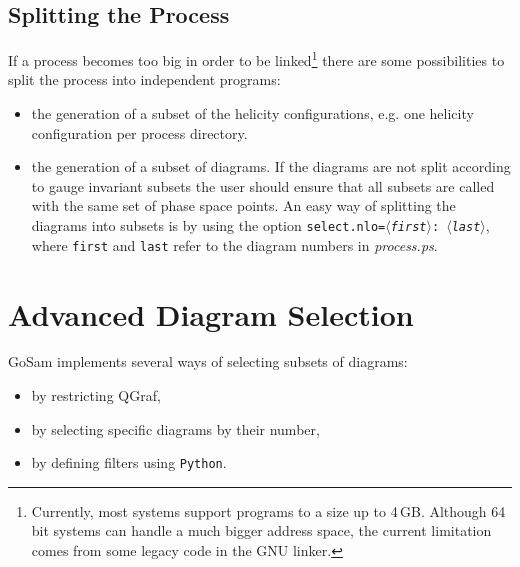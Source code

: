 \documentclass[11pt,a4paper]{refrep}
\newcommand{\gosamversion}{{2{.}0}}
\newcommand{\gosamv}[1][\gosamversion]{{\sc GoSam}\xspace}
\newcommand{\python}{{\tt Python}\xspace}
\begin{document}
\subsection{Splitting the Process}
If a process becomes too big in order to be linked\footnote{
Currently, most systems support programs to a size up to 4\,GB.
Although 64\,bit systems can handle a much bigger address space,
the current limitation comes from some legacy code in the GNU linker.}
there are some possibilities to split the process into independent
programs:
\begin{itemize}
\item the generation of a subset of the helicity configurations, 
e.g. one helicity configuration
      per process directory.
\item the generation of a subset of diagrams. If the diagrams are not
      split according to gauge invariant subsets the user should ensure
      that all subsets are called with the same set of phase space points.
      An easy way of splitting the diagrams into subsets is by using
      the option \texttt{select.nlo=\textit{$\langle$first$\rangle$}:\textit{%
       $\langle$last$\rangle$}}, where \texttt{first} and \texttt{last} refer to the 
       diagram numbers in {\em process.ps}.
\end{itemize}


\section{Advanced Diagram Selection}
\gosamv implements several ways of selecting subsets of diagrams:
\begin{itemize}
\item by restricting QGraf,
\item by selecting specific diagrams by their number,
\item by defining filters using \python.
\end{itemize}
\end{document}
